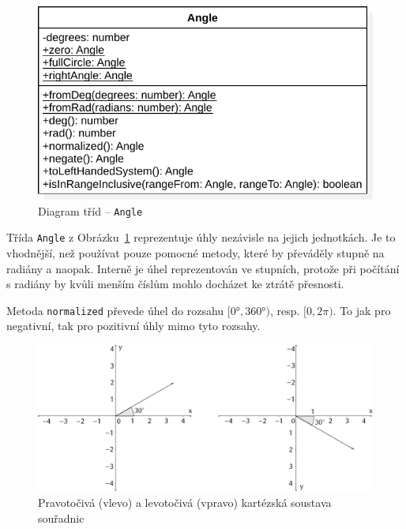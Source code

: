 \begin{figure}[!htb]
  \centering
  \includegraphics[width=\maxwidth{\textwidth}]{../img/diagrams/angle-class-diagram.pdf}
  \caption{Diagram tříd -- \texttt{Angle}}
  \label{fig:angle-class-diagram}
\end{figure}

Třída \texttt{Angle} z Obrázku~\ref{fig:angle-class-diagram} reprezentuje úhly nezávisle na jejich jednotkách.
Je to vhodnější, než používat pouze pomocné metody, které by převáděly stupně na radiány a naopak.
Interně je úhel reprezentován ve stupních, protože při počítání s radiány by kvůli menším číslům mohlo docházet ke ztrátě přesnosti.

Metoda \texttt{normalized} převede úhel do rozsahu $[0°, 360°)$, resp. $[0, 2\pi)$.
To jak pro negativní, tak pro pozitivní úhly mimo tyto rozsahy.

\begin{figure}[!htb]
  \centering
  \includegraphics[width=\maxwidth{\textwidth}]{../img/cartesian-systems.pdf}
  \caption[Pravotočivá a levotočivá kartézská soustava souřadnic]{Pravotočivá (vlevo) a levotočivá (vpravo) kartézská soustava souřadnic}
  \label{fig:cartesian-systems}
\end{figure}

